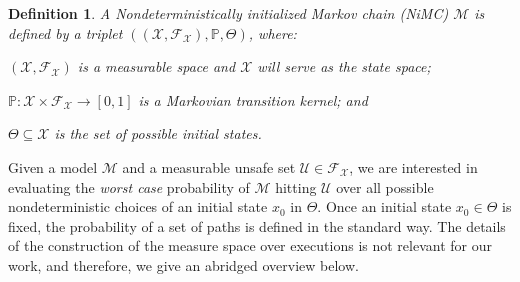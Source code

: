 \documentclass[11pt]{report}
\newtheorem{definition}{Definition}
\newcommand{\M}{\mathcal{M}}
\newcommand{\X}{\mathcal{X}}
\newcommand{\F}{\mathcal{F}}
\newcommand{\Unsafe}{\mathcal{U}}
\newcommand{\modelname}{NiMC\xspace}
\begin{document}
\begin{definition}
\label{def:mpis}
A {\em Nondeterministically initialized Markov chain (\modelname)\/} $\M$ is defined by a triplet $((\X, \F_\X), \mathbb{P}, \Theta)$, where:
\begin{inparaenum}[(i)]
\item $(\X, \F_\X)$ is a measurable space and $\X$ will serve as the state space;
\item $\mathbb{P}:\X \times \F_\X \rightarrow [0, 1]$ is a Markovian {\em transition kernel}; and
\item $\Theta \subseteq \X$ is the set of possible initial states.
\end{inparaenum}
\end{definition}


Given a model $\M$ and a measurable unsafe set $\Unsafe \in \F_\X$, we are interested in evaluating the {\em worst case\/} probability of $\M$ hitting $\Unsafe$ over all possible nondeterministic choices of an initial state $x_0$ in $\Theta$. Once an initial state $x_0 \in \Theta$ is fixed, the probability of a set of paths is defined in the standard way. The details of the construction of the measure space over executions is not relevant for our work, and therefore, we give an abridged overview below.
\end{document}
